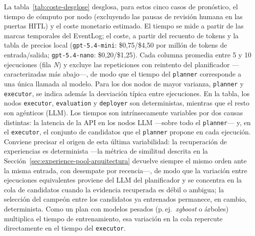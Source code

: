 \documentclass[12pt,a4paper]{article}
\theoremstyle{plain}
\begin{document}
La tabla~\ref{tab:coste-desglose} desglosa, para estos cinco casos de pronóstico, el tiempo de
cómputo por nodo (excluyendo las pausas de revisión humana en las puertas HITL) y el coste
monetario estimado. El tiempo se mide a partir de las marcas temporales del EventLog; el coste,
a partir del recuento de tokens y la tabla de precios local (\texttt{gpt-5.4-mini}:
\$0,75/\$4,50 por millón de tokens de entrada/salida; \texttt{gpt-5.4-nano}: \$0,20/\$1,25).
Cada columna promedia entre 5 y 10 ejecuciones (fila \textit{N}) y excluye las repeticiones con
reintento del planificador —caracterizadas más abajo—, de modo que el tiempo del \texttt{planner}
corresponde a una única llamada al modelo. Para los dos nodos de mayor varianza, \texttt{planner}
y \texttt{executor}, se indica además la desviación típica entre ejecuciones. En la tabla, los nodos
\texttt{executor}, \texttt{evaluation} y \texttt{deployer} son deterministas, mientras que el resto
son agénticos (LLM). Los tiempos son intrínsecamente variables por dos causas distintas: la latencia
de la API en los nodos LLM —sobre todo el \texttt{planner}— y, en el \texttt{executor}, el conjunto
de candidatos que el \texttt{planner} propone en cada ejecución. Conviene precisar el origen de esta
última variabilidad: la recuperación de experiencias es determinista —la métrica de similitud
descrita en la Sección~\ref{sec:experience-pool-arquitectura} devuelve siempre el mismo orden ante la
misma entrada, con desempate por recencia—, de modo que la variación entre ejecuciones equivalentes
proviene del LLM del planificador y se concentra en la cola de candidatos cuando la evidencia
recuperada es débil o ambigua; la selección del campeón entre los candidatos ya entrenados permanece,
en cambio, determinista. Como un plan con modelos pesados (p.\,ej.\ \textit{xgboost} o árboles)
multiplica el tiempo de entrenamiento, esa variación en la cola repercute directamente en el tiempo
del \texttt{executor}. %
\end{document}

